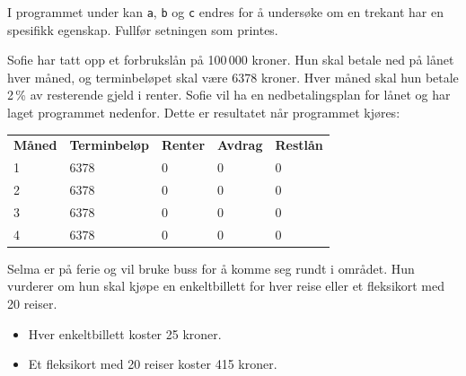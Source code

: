 I programmet under kan \texttt{a}, \texttt{b} og \texttt{c} endres for å undersøke om en trekant har en spesifikk egenskap. Fullfør setningen som printes.





Sofie har tatt opp et forbrukslån på 100\,000 kroner. Hun skal betale ned på lånet hver måned, og terminbeløpet skal være 6378 kroner. Hver måned skal hun betale 2\,\% av resterende gjeld i renter.
Sofie vil ha en nedbetalingsplan for lånet og har laget programmet nedenfor.
Dette er resultatet når programmet kjøres:
\begin{center}
	\small
	\ttfamily
	\begin{tabular}{lllll}
		\textbf{Måned} & \textbf{Terminbeløp} & \textbf{Renter} & \textbf{Avdrag} & \textbf{Restlån} \\
		1 & 6378 & 0 & 0 & 0 \\
		2 & 6378 & 0 & 0 & 0 \\
		3 & 6378 & 0 & 0 & 0 \\
		4 & 6378 & 0 & 0 & 0 \\
	\end{tabular}
\end{center}

\newpage
{}
Selma er på ferie og vil bruke buss for å komme seg rundt i området. Hun vurderer
om hun skal kjøpe en enkeltbillett for hver reise eller et fleksikort med 20 reiser.
\begin{itemize}
	\item Hver enkeltbillett koster 25 kroner.
	\item Et fleksikort med 20 reiser koster 415 kroner.
\end{itemize}

